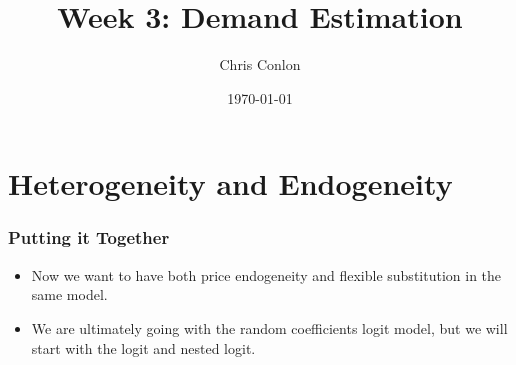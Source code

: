 \def\beamerclassoptions{[xcolor=pdftex,dvipsnames,table,mathserif,aspectratio=169]}


\usepackage[english]{babel}
\usepackage{pgf,pgfarrows,pgfnodes,pgfautomata,pgfheaps}
\usepackage{amsmath,amssymb,setspace,centernot}
\usepackage[latin1]{inputenc}
\usepackage[T1]{fontenc}
\usepackage{relsize}
\usepackage{pdfpages}
\usepackage[absolute,overlay]{textpos} 

\newenvironment{reference}[2]{%
  \begin{textblock*}{\textwidth}(#1,#2) 
      \footnotesize\it\bgroup\color{red!50!black}}{\egroup\end{textblock*}} 




\newcommand{\X}{\mathtt{X}}
\newcommand{\Y}{\mathtt{Y}}

\newcommand{\p}{\mathbb{P}}
\newcommand*\df{\mathop{}\!\mathrm{d}}
\newcommand{\del}{\partial}


\title{Week 3: Demand Estimation}
\author{Chris Conlon}
\date{\today}

\frame{\titlepage}

\section{Heterogeneity and Endogeneity}

\begin{frame}
\frametitle{Putting it Together}
 \begin{itemize}
\item Now we want to have both \alert{price endogeneity} and \alert{flexible substitution} in the same model.
\item We are ultimately going with the random coefficients logit model, but we will start with the logit and nested logit.
 \end{itemize}
\end{frame}

